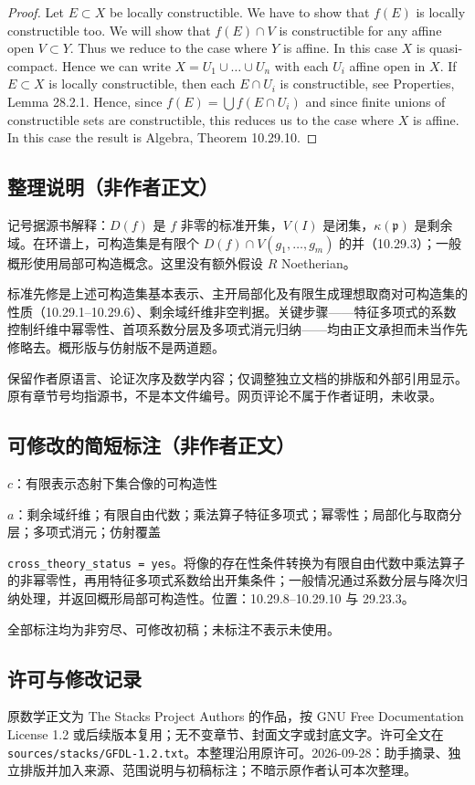 \documentclass[UTF8,11pt]{ctexart}
\theoremstyle{definition}
\begin{document}
\begin{proof}
Let $E\subset X$ be locally constructible. We have to show that $f(E)$ is locally constructible too. We will show that $f(E)\cap V$ is constructible for any affine open $V\subset Y$. Thus we reduce to the case where $Y$ is affine. In this case $X$ is quasi-compact. Hence we can write $X=U_1\cup\ldots\cup U_n$ with each $U_i$ affine open in $X$. If $E\subset X$ is locally constructible, then each $E\cap U_i$ is constructible, see Properties, Lemma 28.2.1. Hence, since $f(E)=\bigcup f(E\cap U_i)$ and since finite unions of constructible sets are constructible, this reduces us to the case where $X$ is affine. In this case the result is Algebra, Theorem 10.29.10.
\end{proof}

\subsection*{整理说明（非作者正文）}
记号据源书解释：$D(f)$ 是 $f$ 非零的标准开集，$V(I)$ 是闭集，$\kappa(\mathfrak p)$ 是剩余域。在环谱上，可构造集是有限个 $D(f)\cap V(g_1,\ldots,g_m)$ 的并（10.29.3）；一般概形使用局部可构造概念。这里没有额外假设 $R$ Noetherian。

标准先修是上述可构造集基本表示、主开局部化及有限生成理想取商对可构造集的性质（10.29.1--10.29.6）、剩余域纤维非空判据。关键步骤——特征多项式的系数控制纤维中幂零性、首项系数分层及多项式消元归纳——均由正文承担而未当作先修略去。概形版与仿射版不是两道题。

保留作者原语言、论证次序及数学内容；仅调整独立文档的排版和外部引用显示。原有章节号均指源书，不是本文件编号。网页评论不属于作者证明，未收录。
\subsection*{可修改的简短标注（非作者正文）}
$c$：有限表示态射下集合像的可构造性

$a$：剩余域纤维；有限自由代数；乘法算子特征多项式；幂零性；局部化与取商分层；多项式消元；仿射覆盖

\texttt{cross\_theory\_status = yes}。将像的存在性条件转换为有限自由代数中乘法算子的非幂零性，再用特征多项式系数给出开集条件；一般情况通过系数分层与降次归纳处理，并返回概形局部可构造性。位置：10.29.8--10.29.10 与 29.23.3。

全部标注均为非穷尽、可修改初稿；未标注不表示未使用。
\subsection*{许可与修改记录}
原数学正文为 The Stacks Project Authors 的作品，按 GNU Free Documentation License 1.2 或后续版本复用；无不变章节、封面文字或封底文字。许可全文在 \texttt{sources/stacks/GFDL-1.2.txt}。本整理沿用原许可。2026-09-28：助手摘录、独立排版并加入来源、范围说明与初稿标注；不暗示原作者认可本次整理。
\end{document}
